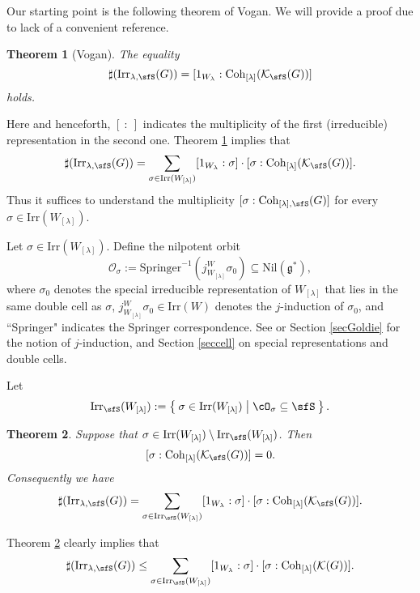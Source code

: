 \documentclass[12pt,a4paper]{amsart}
\def\subset{\subseteq}
\newcommand{\CK}{{\mathcal {K}}}
\newcommand{\CO}{{\mathcal {O}}}
\newcommand{\g}{\mathfrak g}
\newcommand{\be}{\begin {equation}}
\newcommand{\ee}{\end {equation}}
\numberwithin{equation}{section}
\newtheorem{thm}{Theorem}[section]
\theoremstyle{remark}
\def\Irr{\mathrm{Irr}}
\def\WLam{W_{\Lam}}
\def\Coh{\mathrm{Coh}}
\providecommand{\nsubset}{\not\subset}
\newcommand{\Lam}{{[\lambda]}}
\begin{document}
Our starting point is the following theorem of Vogan. We will provide a proof due to lack of a convenient reference.
\begin{thm}[Vogan]\label{count1}
  The equality
  \[
    \sharp(\Irr_{\lambda,\sfS}(G)) = [1_{W_{\lambda}}:\Coh_{\Lam}(\CK_\sfS(G))]
  \]
  holds.
\end{thm}
Here and henceforth, $[\ : \ ]$ indicates the multiplicity of the first
(irreducible) representation in the second one. Theorem \ref{count1} implies
that
\[
  \sharp(\Irr_{\lambda,\sfS}(G)) = \sum_{\sigma\in \Irr(W_\Lam)} [1_{W_{\lambda}}: \sigma]\cdot [\sigma: \Coh_{\Lam}(\CK_\sfS(G))].
\]
Thus it suffices to understand the multiplicity $ [\sigma: \Coh_{\Lam,\sfS}(G)]$
for every $\sigma\in \Irr(W_\Lam)$.

Let $\sigma\in \Irr(W_\Lam)$. Define the
nilpotent orbit
\[
  \CO_\sigma:=\mathrm{Springer}^{-1}
  (j_{W_\Lam}^W \sigma_0)\subset \mathrm{Nil}(\g^*),
  \]
where $\sigma_0$ denotes the special irreducible representation of $W_\Lam$ that
lies in the same double cell as $\sigma$, $j_{W_\Lam}^W \sigma_0\in \Irr(W)$ denotes
the $j$-induction of $\sigma _0$, and  ``Springer"  indicates the Springer correspondence. See \cite[Chapter 11]{Carter} or Section \ref{secGoldie} for the notion of $j$-induction, and Section \ref{seccell} on special representations and double cells.


Let
\be\label{sfc}
  \Irr_\sfS(W_\Lam):= \Set{\sigma\in \Irr(\WLam)| \cO_{\sigma}\subset \sfS}.
\ee

\begin{thm}\label{count2}
  Suppose that $\sigma\in \Irr(W_\Lam)\setminus \Irr_\sfS(W_\Lam)$. Then
  \[
    [\sigma:\Coh_{\Lam}(\CK_\sfS(G))]=0.
  \]
Consequently we have
\begin{equation}\label{leq002}
  \sharp(\Irr_{\lambda,\sfS}(G)) = \sum_{\sigma \in \Irr_\sfS(W_\Lam)} [1_{W_{\lambda}}: \sigma]\cdot [\sigma:\Coh_{\Lam}(\CK_\sfS(G))].
  \end{equation}
\end{thm}


Theorem \ref{count2} clearly implies that
\begin{equation}\label{leq2}  \sharp(\Irr_{\lambda,\sfS}(G)) \leq  \sum_{\sigma \in \Irr_\sfS(W_\Lam)} [1_{W_{\lambda}}: \sigma]\cdot [\sigma:\Coh_{\Lam}(\CK(G))].
\end{equation}
\end{document}
